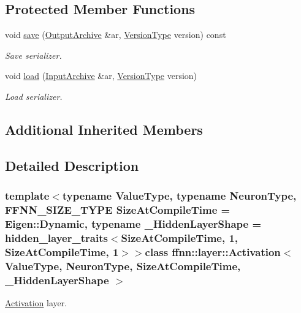 \subsection*{Protected Member Functions}
\begin{DoxyCompactItemize}
\item 
void \hyperlink{classffnn_1_1layer_1_1_activation_af4fa0c4e44033921fe6ada1dcd0c0560}{save} (\hyperlink{classffnn_1_1internal_1_1_serializable_acf5baead716eb277337a4437e88a5743}{Output\-Archive} \&ar, \hyperlink{classffnn_1_1internal_1_1_serializable_a32fe7d82b0caf9fe8b6fb7c312a26028}{Version\-Type} version) const 
\begin{DoxyCompactList}\small\item\em Save serializer. \end{DoxyCompactList}\item 
void \hyperlink{classffnn_1_1layer_1_1_activation_abf041de6c530dfb271dd42689927eebe}{load} (\hyperlink{classffnn_1_1internal_1_1_serializable_aadc27d79d606f35a82dd88bad33fa6d2}{Input\-Archive} \&ar, \hyperlink{classffnn_1_1internal_1_1_serializable_a32fe7d82b0caf9fe8b6fb7c312a26028}{Version\-Type} version)
\begin{DoxyCompactList}\small\item\em Load serializer. \end{DoxyCompactList}\end{DoxyCompactItemize}
\subsection*{Additional Inherited Members}


\subsection{Detailed Description}
\subsubsection*{template$<$typename Value\-Type, typename Neuron\-Type, F\-F\-N\-N\-\_\-\-S\-I\-Z\-E\-\_\-\-T\-Y\-P\-E Size\-At\-Compile\-Time = Eigen\-::\-Dynamic, typename \-\_\-\-Hidden\-Layer\-Shape = hidden\-\_\-layer\-\_\-traits$<$\-Size\-At\-Compile\-Time, 1, Size\-At\-Compile\-Time, 1$>$$>$class ffnn\-::layer\-::\-Activation$<$ Value\-Type, Neuron\-Type, Size\-At\-Compile\-Time, \-\_\-\-Hidden\-Layer\-Shape $>$}

\hyperlink{classffnn_1_1layer_1_1_activation}{Activation} layer. 

